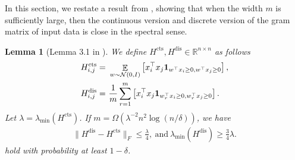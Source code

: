 \documentclass[11pt]{article}
\DeclareMathOperator*{\E}{\mathbb{E}}
\newcommand{\N}{\mathcal{N}}
\DeclareMathOperator{\dis}{dis}
\DeclareMathOperator{\cts}{cts}
\newcommand{\R}{\mathbb{R}}
\newtheorem{lemma}[theorem]{Lemma}
\begin{document}
In this section, we restate a result from \cite{dzps19}, showing that when the width $m$ is sufficiently large,
then the continuous version and discrete version of the gram matrix of input data is close in the spectral sense.
\begin{lemma}[Lemma 3.1 in \cite{dzps19}]\label{lem:3.1}
We define $H^{\cts}, H^{\dis} \in \R^{n \times n}$ as follows
\begin{align*}
H^{\cts}_{i,j} = & ~ \E_{w \sim \N(0,I)} \left[ x_i^\top x_j {\bf 1}_{ w^\top x_i \geq 0, w^\top x_j \geq 0 } \right] , \\ 
H^{\dis}_{i,j} = & ~ \frac{1}{m} \sum_{r=1}^m \left[ x_i^\top x_j {\bf 1}_{ w_r^\top x_i \geq 0, w_r^\top x_j \geq 0 } \right].
\end{align*}
Let $\lambda = \lambda_{\min} (H^{\cts}) $. If $m = \Omega( \lambda^{-2} n^2\log (n/\delta) )$, we have 
\begin{align*}
\| H^{\dis} - H^{\cts} \|_F \leq \frac{ \lambda }{4}, \mathrm{~and~} \lambda_{\min} ( H^{\dis} ) \geq \frac{3}{4} \lambda.
\end{align*}
hold with probability at least $1-\delta$.
\end{lemma}
\end{document}

